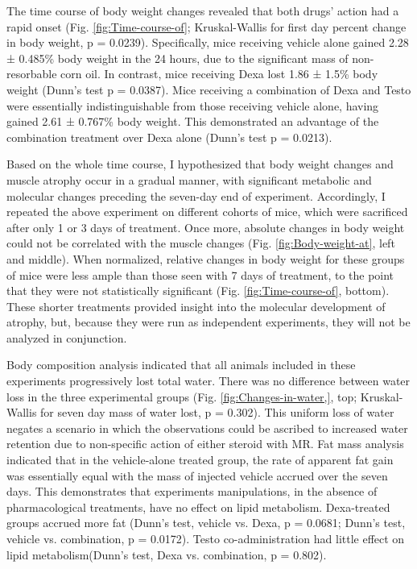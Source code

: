 \documentclass[12pt,english]{report}\usepackage[]{graphicx}\usepackage[]{color}
\begin{document}
The time course of body weight changes revealed that both drugs' action
had a rapid onset (Fig. \ref{fig:Time-course-of}; Kruskal-Wallis
for first day percent change in body weight, p = 0.0239).
Specifically, mice receiving vehicle alone gained 2.28
± 0.485\%
body weight in the 24 hours, due to the significant mass of non-resorbable
corn oil. In contrast, mice receiving Dexa lost 1.86
± 1.5\%
body weight (Dunn's test p = 0.0387).
Mice receiving a combination of Dexa and Testo were essentially indistinguishable
from those receiving vehicle alone, having gained 2.61
± 0.767\%
body weight. This demonstrated an advantage of the combination treatment
over Dexa alone (Dunn's test p = 0.0213).

Based on the whole time course, I hypothesized that body weight changes
and muscle atrophy occur in a gradual manner, with significant metabolic
and molecular changes preceding the seven-day end of experiment. Accordingly,
I repeated the above experiment on different cohorts of mice, which
were sacrificed after only 1 or 3 days of treatment. Once more, absolute
changes in body weight could not be correlated with the muscle changes
(Fig. \ref{fig:Body-weight-at}, left and middle). When normalized,
relative changes in body weight for these groups of mice were less
ample than those seen with 7 days of treatment, to the point that
they were not statistically significant (Fig. \ref{fig:Time-course-of},
bottom). These shorter treatments provided insight into the molecular
development of atrophy, but, because they were run as independent
experiments, they will not be analyzed in conjunction.

Body composition analysis indicated that all animals included in these
experiments progressively lost total water. There was no difference
between water loss in the three experimental groups (Fig. \ref{fig:Changes-in-water,},
top; Kruskal-Wallis for seven day mass of water lost, p = 0.302).
This uniform loss of water negates a scenario in which the observations
could be ascribed to increased water retention due to non-specific
action of either steroid with MR. Fat mass analysis indicated that
in the vehicle-alone treated group, the rate of apparent fat gain
was essentially equal with the mass of injected vehicle accrued over
the seven days. This demonstrates that experiments manipulations,
in the absence of pharmacological treatments, have no effect on lipid
metabolism. Dexa-treated groups accrued more fat (Dunn's test, vehicle
vs. Dexa, p = 0.0681;
Dunn's test, vehicle vs. combination, p = 0.0172).
Testo co-administration had little effect on lipid metabolism(Dunn's
test, Dexa vs. combination, p = 0.802).
\end{document}

